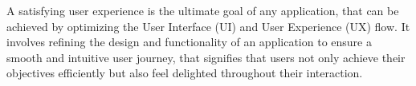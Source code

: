 
A satisfying user experience is the ultimate goal of any application, that can be achieved by optimizing the User 
Interface (UI) and User Experience (UX) flow. It involves refining the design and functionality of an application to 
ensure a smooth and intuitive user journey, that signifies that users not only achieve their objectives efficiently but 
also feel delighted throughout their interaction.
